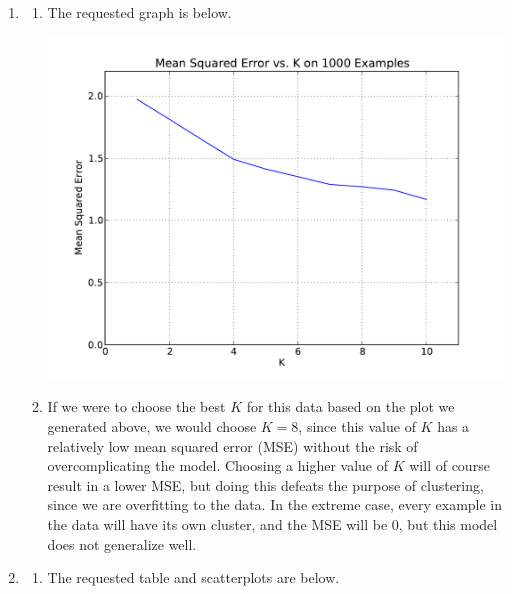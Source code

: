 \documentclass[solution, letterpaper]{cs121}
\begin{document}




\begin{enumerate}
	\item 
		\begin{enumerate}
			\item The requested graph is below.
				\begin{center}
				\includegraphics[scale=0.8]{mse-vs-k.pdf}
				\end{center}
			\item If we were to choose the best $K$ for this data based on the plot we generated above, we would choose $K = 8$, since this value of $K$ has a relatively low mean squared error (MSE) without the risk of overcomplicating the model. Choosing a higher value of $K$ will of course result in a lower MSE, but doing this defeats the purpose of clustering, since we are overfitting to the data. In the extreme case, every example in the data will have its own cluster, and the MSE will be 0, but this model does not generalize well.
		\end{enumerate}
	\item
		\begin{enumerate}
			\item The requested table and scatterplots are below. \\

\end{enumerate}
\end{enumerate}
\end{document}
